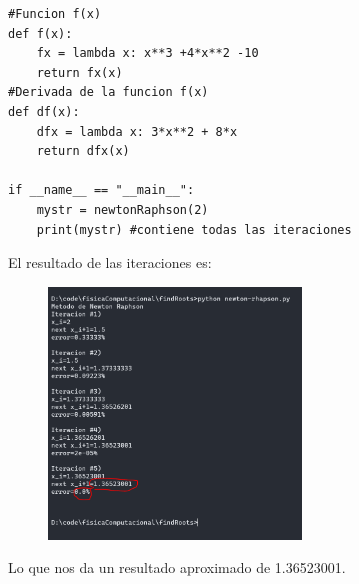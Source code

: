 \documentclass[a4paper,12pt]{article}
\begin{document}
\begin{lstlisting}
#Funcion f(x)
def f(x):
    fx = lambda x: x**3 +4*x**2 -10
    return fx(x)
#Derivada de la funcion f(x)
def df(x):
    dfx = lambda x: 3*x**2 + 8*x
    return dfx(x)

if __name__ == "__main__":
    mystr = newtonRaphson(2)
    print(mystr) #contiene todas las iteraciones
\end{lstlisting}
    El resultado de las iteraciones es:
    \begin{figure}[h]
        \centering
        \includegraphics[width=0.6\textwidth]{f7console.PNG}
    \end{figure}

    Lo que nos da un resultado aproximado de 1.36523001.

    \clearpage
\end{document}
